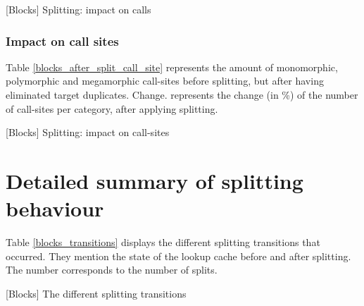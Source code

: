 \documentclass[10pt, sigplan, preprint]{acmart}
\begin{document}
\begin{table}[h!]
	\centering
	\tiny
	\BlockAfterSplitCallsMini
	\caption{[Blocks] Splitting: impact on calls}
\end{table}

\subsubsection{\textbf{Impact on call sites}}

Table \ref{blocks_after_split_call_site} represents the amount of monomorphic, polymorphic and megamorphic call-sites before splitting, but after having eliminated target duplicates.
Change. represents the change (in \%) of the number of call-sites per category, after applying splitting.

\begin{table}[h!]
	\centering
	\tiny
	\BlockAfterSplitSites
	\caption{[Blocks] Splitting: impact on call-sites}
	\label{blocks_after_split_call_site}
\end{table}

\section{Detailed summary of splitting behaviour}

Table \ref{blocks_transitions} displays the different splitting transitions that occurred. They mention the state of the lookup cache before and after splitting. The number corresponds to the number of splits.

\begin{table}[h!]
	\centering
	\tiny
	\BlockSplittingTransitions
	\caption{[Blocks] The different splitting transitions}
	\label{blocks_transitions}
\end{table}
\end{document}
